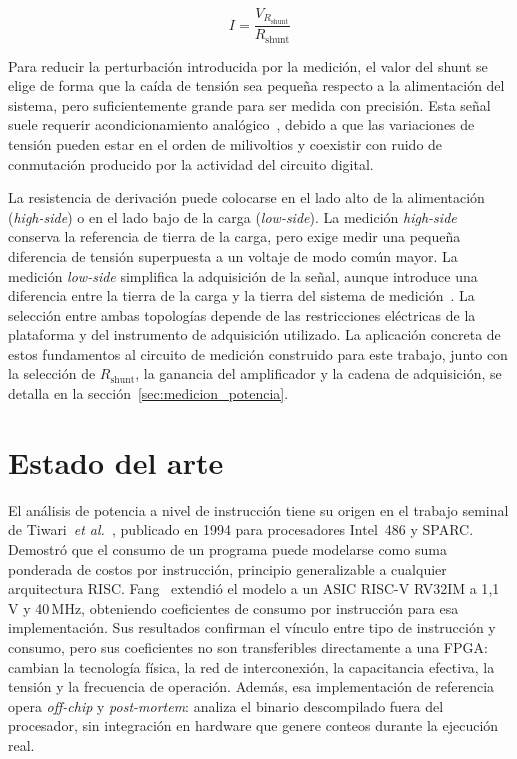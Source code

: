 \begin{equation}
    I = \frac{V_{R_\text{shunt}}}{R_\text{shunt}}
    \label{eq:corriente_shunt}
\end{equation}

Para reducir la perturbación introducida por la medición, el valor del shunt se
elige de forma que la caída de tensión sea pequeña respecto a la alimentación
del sistema, pero suficientemente grande para ser medida con precisión. Esta
señal suele requerir acondicionamiento analógico~\cite{ina240ds}, debido a que
las variaciones de tensión pueden estar en el orden de milivoltios y coexistir
con ruido de conmutación producido por la actividad del circuito digital.

La resistencia de derivación puede colocarse en el lado alto de la alimentación
(\emph{high-side}) o en el lado bajo de la carga (\emph{low-side}). La medición
\emph{high-side} conserva la referencia de tierra de la carga, pero exige medir
una pequeña diferencia de tensión superpuesta a un voltaje de modo común mayor.
La medición \emph{low-side} simplifica la adquisición de la señal, aunque
introduce una diferencia entre la tierra de la carga y la tierra del sistema de
medición~\cite{ti_current_sensing}. La selección entre ambas topologías depende
de las restricciones eléctricas de la plataforma y del instrumento de
adquisición utilizado. La aplicación concreta de estos fundamentos al circuito
de medición construido para este trabajo, junto con la selección de
$R_\text{shunt}$, la ganancia del amplificador y la cadena de adquisición, se
detalla en la sección~\ref{sec:medicion_potencia}.

\section{Estado del arte}
\label{sec:estado_arte}

El análisis de potencia a nivel de instrucción tiene su origen en el trabajo
seminal de Tiwari~\emph{et al.}~\cite{tiwari1994power}, publicado en 1994 para
procesadores Intel~486 y SPARC. Demostró que el consumo de un programa puede
modelarse como suma ponderada de costos por instrucción, principio generalizable
a cualquier arquitectura RISC. Fang~\cite{fang2021instruction} extendió el modelo
a un ASIC RISC-V RV32IM a 1{,}1\,V y 40\,MHz, obteniendo coeficientes de
consumo por instrucción para esa implementación. Sus resultados confirman el
vínculo entre tipo de instrucción y consumo, pero sus coeficientes no son
transferibles directamente a una FPGA: cambian la tecnología física, la red de
interconexión, la capacitancia efectiva, la tensión y la frecuencia de
operación. Además, esa implementación de referencia opera
\emph{off-chip} y \emph{post-mortem}: analiza el binario descompilado fuera
del procesador, sin integración en hardware que genere conteos durante la ejecución real.


